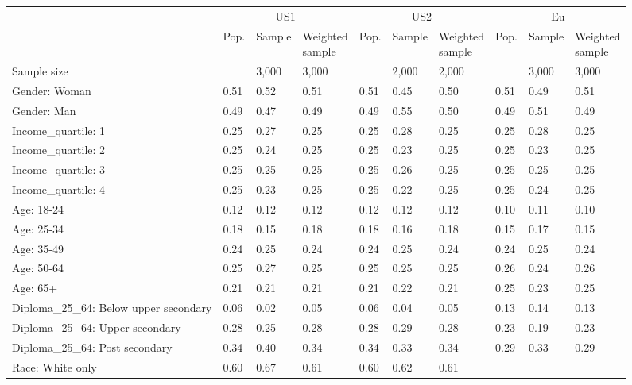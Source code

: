 
\begin{tabular}[t]{llllllllll}
\toprule
\multicolumn{1}{c}{} & \multicolumn{3}{c}{US1} & \multicolumn{3}{c}{US2} & \multicolumn{3}{c}{Eu} \\
\cmidrule(l{3pt}r{3pt}){2-4} \cmidrule(l{3pt}r{3pt}){5-7} \cmidrule(l{3pt}r{3pt}){8-10}
  & Pop. & Sample & \makecell{Weighted\\sample} & Pop. & Sample & \makecell{Weighted\\sample} & Pop. & Sample & \makecell{Weighted\\sample}\\
\midrule
Sample size &  & 3,000 & 3,000 &  & 2,000 & 2,000 &  & 3,000 & 3,000\\
\addlinespace
Gender: Woman & 0.51 & 0.52 & 0.51 & 0.51 & 0.45 & 0.50 & 0.51 & 0.49 & 0.51\\
Gender: Man & 0.49 & 0.47 & 0.49 & 0.49 & 0.55 & 0.50 & 0.49 & 0.51 & 0.49\\
\addlinespace
Income\_quartile: 1 & 0.25 & 0.27 & 0.25 & 0.25 & 0.28 & 0.25 & 0.25 & 0.28 & 0.25\\
Income\_quartile: 2 & 0.25 & 0.24 & 0.25 & 0.25 & 0.23 & 0.25 & 0.25 & 0.23 & 0.25\\
Income\_quartile: 3 & 0.25 & 0.25 & 0.25 & 0.25 & 0.26 & 0.25 & 0.25 & 0.25 & 0.25\\
Income\_quartile: 4 & 0.25 & 0.23 & 0.25 & 0.25 & 0.22 & 0.25 & 0.25 & 0.24 & 0.25\\
\addlinespace
Age: 18-24 & 0.12 & 0.12 & 0.12 & 0.12 & 0.12 & 0.12 & 0.10 & 0.11 & 0.10\\
Age: 25-34 & 0.18 & 0.15 & 0.18 & 0.18 & 0.16 & 0.18 & 0.15 & 0.17 & 0.15\\
Age: 35-49 & 0.24 & 0.25 & 0.24 & 0.24 & 0.25 & 0.24 & 0.24 & 0.25 & 0.24\\
Age: 50-64 & 0.25 & 0.27 & 0.25 & 0.25 & 0.25 & 0.25 & 0.26 & 0.24 & 0.26\\
Age: 65+ & 0.21 & 0.21 & 0.21 & 0.21 & 0.22 & 0.21 & 0.25 & 0.23 & 0.25\\
\addlinespace
Diploma\_25\_64: Below upper secondary & 0.06 & 0.02 & 0.05 & 0.06 & 0.04 & 0.05 & 0.13 & 0.14 & 0.13\\
Diploma\_25\_64: Upper secondary & 0.28 & 0.25 & 0.28 & 0.28 & 0.29 & 0.28 & 0.23 & 0.19 & 0.23\\
Diploma\_25\_64: Post secondary & 0.34 & 0.40 & 0.34 & 0.34 & 0.33 & 0.34 & 0.29 & 0.33 & 0.29\\
\addlinespace
Race: White only & 0.60 & 0.67 & 0.61 & 0.60 & 0.62 & 0.61 &  &  & \\

\end{tabular}
